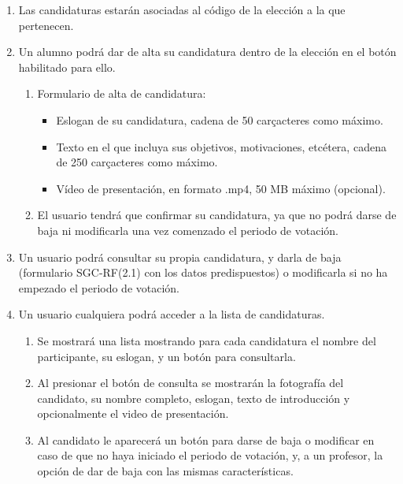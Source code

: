 \documentclass{article}
\begin{document}
        \begin{enumerate}[label=\textbf{SGC-RF(\arabic*)}, labelwidth=25mm, labelsep=2mm, itemindent=0mm, leftmargin=*, align=parleft] 
            \item Las candidaturas estarán asociadas al código de la elección a la que pertenecen.

            \item Un alumno podrá dar de alta su candidatura dentro de la elección en el botón habilitado para ello.
            \begin{adjustwidth}{15mm}{0mm}
                \begin{enumerate}[label=\textbf{SGC-RF(2.\arabic*)}]
                    \item Formulario de alta de candidatura:
                        \begin{itemize}
                            \item Eslogan de su candidatura, cadena de 50 carçacteres como máximo.
                            \item Texto en el que incluya sus objetivos, motivaciones, etcétera, cadena de 250 carçacteres como máximo.
                            \item Vídeo de presentación, en formato .mp4, 50 MB máximo (opcional).
                        \end{itemize}
                    \item El usuario tendrá que confirmar su candidatura, ya que no podrá darse de baja ni modificarla una vez comenzado el periodo de votación.
                \end{enumerate}
            \end{adjustwidth}

            \item Un usuario podrá consultar su propia candidatura, y darla de baja (formulario SGC-RF(2.1) con los datos predispuestos) o modificarla si no ha empezado el periodo de votación.

            \item Un usuario cualquiera podrá acceder a la lista de candidaturas.
            \begin{adjustwidth}{15mm}{0mm}
                \begin{enumerate}[label=\textbf{SGC-RF(4.\arabic*)}]
                    \item Se mostrará una lista mostrando para cada candidatura el nombre del participante, su eslogan, y un botón para consultarla.
                    \item Al presionar el botón de consulta se mostrarán la fotografía del candidato, su nombre completo, eslogan, texto de introducción y opcionalmente el video de presentación.
                    \item Al candidato le aparecerá un botón para darse de baja o modificar en caso de que no haya iniciado el periodo de votación, y, a un profesor, la opción de dar de baja con las mismas características.
                \end{enumerate}
            \end{adjustwidth}
        \end{enumerate}
\end{document}
